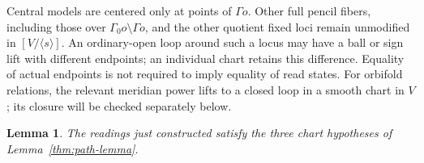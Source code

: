 \documentclass[11pt,reqno]{amsart}
\numberwithin{equation}{section}
\newtheorem{lemma}[theorem]{Lemma}
\theoremstyle{definition}
\theoremstyle{remark}
\begin{document}
Central models are centered only at points of $\Gamma o$.  Other
full pencil fibers, including those over
$\Gamma_0o\setminus\Gamma o$, and the other quotient fixed loci
remain unmodified in $[V/\langle s\rangle]$.  An ordinary-open loop around such a locus may have a ball or
sign lift with different endpoints; an individual chart retains this
difference.  Equality of actual endpoints is not required to imply
equality of read states.  For orbifold relations, the relevant
meridian power lifts to a closed loop in a smooth chart in $V$;
its closure will be checked separately below.

\begin{lemma}\label{app:chart-axioms}
The readings just constructed satisfy the three chart hypotheses of
Lemma~\ref{thm:path-lemma}.
\end{lemma}
\end{document}
